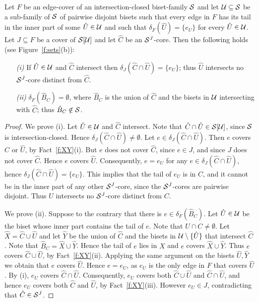 \begin{lemma}
Let $F$ be an edge-cover of an intersection-closed biset-family ${\cal S}$ and let
${\cal U} \subseteq {\cal S}$ be a sub-family of ${\cal S}$ of pairwise disjoint bisets 
such that every edge in $F$ has its tail in the inner part of some $\hat{U} \in {\cal U}$ and
such that $\delta_F(\hat{U})=\{e_U\}$ for every $\hat{U} \in {\cal U}$.
Let $J \subseteq F$ be a cover of ${\cal S}[{\cal U}]$ and let $\hat{C}$ be an ${\cal S}^J$-core.
Then the following holds (see Figure~\ref{f:sets}(b)):
\begin{itemize}
\item[{\em (i)}]
If $\hat{U} \in {\cal U}$ and $\hat{C}$ intersect then $\delta_J(\hat{C} \cap \hat{U})=\{e_U\}$;
thus $\hat{U}$ intersects no ${\cal S}^J$-core distinct from $\hat{C}$.
\item[{\em (ii)}]
$\delta_F(\hat{B}_C)=\emptyset$, where $\hat{B}_C$ is the union of $\hat{C}$ 
and the bisets in ${\cal U}$ intersecting with $\hat{C}$;
thus $\hat{B}_C \notin {\cal S}$.
\end{itemize}
\end{lemma}
\begin{proof}
We prove (i). Let $\hat{U} \in {\cal U}$ and $\hat{C}$ intersect.  
Note that $\hat{C} \cap \hat{U} \in {\cal S}[{\cal U}]$, since ${\cal S}$ is intersection-closed.
Hence $\delta_J(\hat{C} \cap \hat{U}) \neq \emptyset$.
Let $e \in \delta_J(\hat{C} \cap \hat{U})$.
Then $e$ covers $\hat{C}$ or $\hat{U}$, by Fact~\ref{f:XY}(i).
But $e$ does not cover $\hat{C}$, since $e \in J$, and since $J$ does not 
cover $\hat{C}$. Hence $e$ covers $\hat{U}$. 
Consequently, $e=e_U$ for any $e \in \delta_J(\hat{C} \cap \hat{U})$,
hence $\delta_J(\hat{C} \cap \hat{U})=\{e_U\}$.
This implies that the tail of $e_U$ is in $C$, and it cannot be in the inner part of 
any other ${\cal S}^J$-core, since the ${\cal S}^J$-cores are pairwise disjoint.
Thus $U$ intersects no ${\cal S}^J$-core distinct from $C$.

We prove (ii). 
Suppose to the contrary that there is $e \in \delta_F(\hat{B}_C)$.
Let $\hat{U} \in {\cal U}$ be the biset whose inner part contains the tail of $e$.
Note that $U \cap C \neq \emptyset$.
Let $\hat{X}=\hat{C} \cup \hat{U}$ and 
let $\hat{Y}$ be the union of $\hat{C}$ and the bisets in ${\cal U} \setminus \{\hat{U}\}$
that intersect $\hat{C}$. Note that $\hat{B}_C=\hat{X} \cup \hat{Y}$.
Hence the tail of $e$ lies in $X$ and $e$ covers $\hat{X} \cup \hat{Y}$.
Thus $e$ covers $\hat{C} \cup \hat{U}$, by Fact~\ref{f:XY}(ii).
Applying the same argument on the bisets $\hat{U},\hat{Y}$ we obtain that $e$ covers $\hat{U}$.
Hence $e=e_U$, as $e_U$ is the only edge in $F$ that covers $\hat{U}$.
By (i), $e_U$ covers $\hat{C} \cap \hat{U}$.
Consequently, $e_U$ covers both $\hat{C} \cup \hat{U}$ and $\hat{C} \cap \hat{U}$,
and hence $e_U$ covers both $\hat{C}$ and $\hat{U}$, by Fact~\ref{f:XY}(iii).
However $e_U \in J$, contradicting that $\hat{C} \in {\cal S}^J$.
\end{proof}

